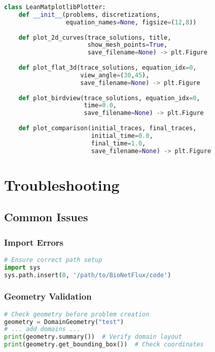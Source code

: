 \documentclass[11pt,a4paper]{article}
\begin{document}
\begin{lstlisting}[language=Python, caption={Plotter API}]
class LeanMatplotlibPlotter:
    def __init__(problems, discretizations, 
                 equation_names=None, figsize=(12,8))
    
    def plot_2d_curves(trace_solutions, title, 
                       show_mesh_points=True,
                       save_filename=None) -> plt.Figure
    
    def plot_flat_3d(trace_solutions, equation_idx=0, 
                     view_angle=(30,45),
                     save_filename=None) -> plt.Figure
    
    def plot_birdview(trace_solutions, equation_idx=0, 
                      time=0.0,
                      save_filename=None) -> plt.Figure
    
    def plot_comparison(initial_traces, final_traces, 
                        initial_time=0.0,
                        final_time=1.0, 
                        save_filename=None) -> plt.Figure
\end{lstlisting}

\section{Troubleshooting}

\subsection{Common Issues}

\subsubsection{Import Errors}
\begin{lstlisting}[language=Python, caption={Path Setup}]
# Ensure correct path setup
import sys
sys.path.insert(0, '/path/to/BioNetFlux/code')
\end{lstlisting}

\subsubsection{Geometry Validation}
\begin{lstlisting}[language=Python, caption={Geometry Debugging}]
# Check geometry before problem creation
geometry = DomainGeometry("test")
# ... add domains ...
print(geometry.summary())  # Verify domain layout
print(geometry.get_bounding_box())  # Check coordinates
\end{lstlisting}
\end{document}
